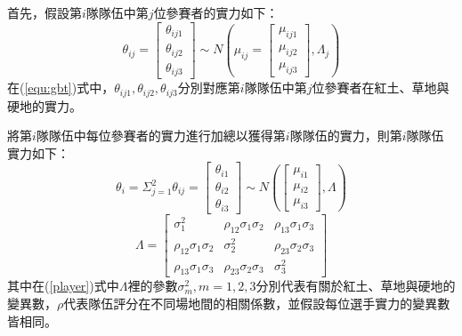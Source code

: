 \documentclass[12pt]{article}
\begin{document}
首先，假設第$i$隊隊伍中第$j$位參賽者的實力如下：
\begin{equation}
\theta_{ij} = \begin{bmatrix}
\theta_{ij1} \\ \theta_{ij2} \\ \theta_{ij3}
\end{bmatrix} \sim N(\mu_{ij} = \begin{bmatrix}
\mu_{ij1}\\ \mu_{ij2} \\ \mu_{ij3}
\end{bmatrix},\Lambda_j)
\label{equ:gbt}
\end{equation}
在(\ref{equ:gbt})式中，$\theta_{ij1},\theta_{ij2},\theta_{ij3}$分別對應第$i$隊隊伍中第$j$位參賽者在紅土、草地與硬地的實力。

將第$i$隊隊伍中每位參賽者的實力進行加總以獲得第$i$隊隊伍的實力，則第$i$隊隊伍實力如下：
\begin{equation}
\theta_i = \Sigma_{j=1}^2{\theta_{ij}} = \begin{bmatrix}
\theta_{i1} \\ \theta_{i2} \\ \theta_{i3}
\end{bmatrix} \sim N\left(\begin{bmatrix}
\mu_{i1} \\ \mu_{i2} \\ \mu_{i3}
\end{bmatrix},\Lambda \right)
\label{player}
\end{equation}
\[
\Lambda =\begin{bmatrix}\sigma^2_1 & \rho_{12} \sigma_1 \sigma_2 & \rho_{13} \sigma_1 \sigma_3 \\\rho_{12} \sigma_1 \sigma_2 & \sigma^2_2 & \rho_{23} \sigma_2 \sigma_3 \\ \rho_{13} \sigma_1 \sigma_3 & \rho_{23} \sigma_2 \sigma_3 & \sigma^2_3 \end{bmatrix}
\]
其中在(\ref{player})式中$\Lambda$裡的參數$\sigma^2_m,m=1,2,3$分別代表有關於紅土、草地與硬地的變異數，$\rho$代表隊伍評分在不同場地間的相關係數，並假設每位選手實力的變異數皆相同。
\end{document}
